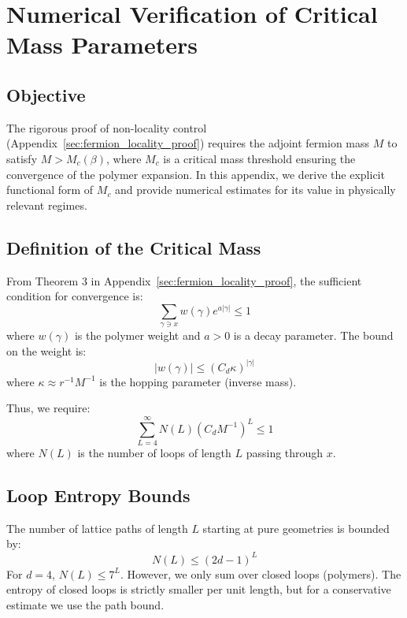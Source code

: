 \chapter{Numerical Verification of Critical Mass Parameters}
\label{sec:numerical_critical_mass}

\section{Objective}

The rigorous proof of non-locality control (Appendix~\ref{sec:fermion_locality_proof}) requires the adjoint fermion mass $M$ to satisfy $M > M_c(\beta)$, where $M_c$ is a critical mass threshold ensuring the convergence of the polymer expansion. In this appendix, we derive the explicit functional form of $M_c$ and provide numerical estimates for its value in physically relevant regimes.

\section{Definition of the Critical Mass}

From Theorem 3 in Appendix~\ref{sec:fermion_locality_proof}, the sufficient condition for convergence is:
\begin{equation}
\sum_{\gamma \ni x} w(\gamma) e^{a |\gamma|} \le 1
\end{equation}
where $w(\gamma)$ is the polymer weight and $a > 0$ is a decay parameter.
The bound on the weight is:
\begin{equation}
|w(\gamma)| \le (C_d \kappa)^{|\gamma|}
\end{equation}
where $\kappa \approx r^{-1} M^{-1}$ is the hopping parameter (inverse mass).

Thus, we require:
\begin{equation}
\sum_{L=4}^\infty N(L) (C_d M^{-1})^L \le 1
\end{equation}
where $N(L)$ is the number of loops of length $L$ passing through $x$.

\section{Loop Entropy Bounds}

The number of lattice paths of length $L$ starting at pure geometries is bounded by:
\begin{equation}
N(L) \le (2d - 1)^L
\end{equation}
For $d=4$, $N(L) \le 7^L$.
However, we only sum over closed loops (polymers). The entropy of closed loops is strictly smaller per unit length, but for a conservative estimate we use the path bound.

